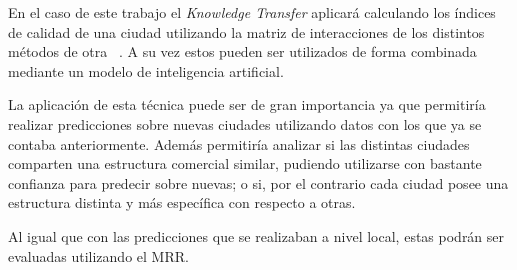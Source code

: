 En el caso de este trabajo el \textit{Knowledge Transfer} aplicará calculando los índices de calidad de una ciudad utilizando la matriz de interacciones de los distintos métodos de otra ~\cite{Ahedo2021}. A su vez estos pueden ser utilizados de forma combinada mediante un modelo de inteligencia artificial.


La aplicación de esta técnica puede ser de gran importancia ya que permitiría realizar predicciones sobre nuevas ciudades utilizando datos con los que ya se contaba anteriormente. Además permitiría analizar si las distintas ciudades comparten una estructura comercial similar, pudiendo utilizarse con bastante confianza para predecir sobre nuevas; o si, por el contrario cada ciudad posee una estructura distinta y más específica con respecto a otras.

Al igual que con las predicciones que se realizaban a nivel local, estas podrán ser evaluadas utilizando el MRR.
	










